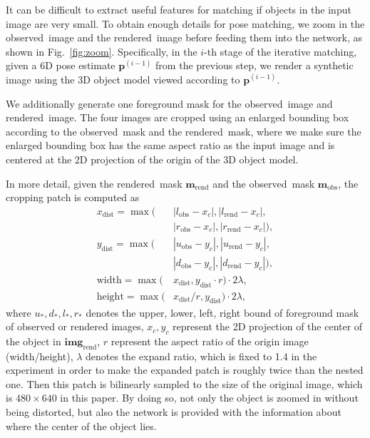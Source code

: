 \documentclass[twocolumn]{svjour3}
\newcommand{\xrend}[0]{\mathbf{img}_{\text{rend}}}
\newcommand{\mreal}[0]{\mathbf{m}_{\text{obs}}}
\newcommand{\mrend}[0]{\mathbf{m}_{\text{rend}}}
\newcommand{\rend}[0]{rendered}
\newcommand{\real}[0]{observed}
\begin{document}
It can be difficult to extract useful features for matching if objects in the input image are very small. 
To obtain enough details for pose matching, we zoom in the \real\ image and the \rend\ image before feeding them into the network, as shown in Fig.~\ref{fig:zoom}. 
Specifically, in the $i$-th stage of the iterative matching, given a 6D pose estimate $\mathbf{p}^{(i-1)}$ from the previous step, we render a synthetic image using the 3D object model viewed according to $\mathbf{p}^{(i-1)}$. 

We additionally generate one foreground mask for the \real\ image and \rend\ image. The four images are cropped using an enlarged bounding box according to the \real\ mask and the \rend\ mask, where we make sure the enlarged bounding box has the same aspect ratio as the input image and is centered at the 2D projection of the origin of the 3D object model. 

In more detail, given the \rend\ mask $\mrend$ and the \real\ mask $\mreal$, the cropping patch is computed as
\begin{equation}
\begin{split}
x_{\text{dist}} = \max(&|l_{\text{obs}}-x_{c}|, |l_{\text{rend}}-x_{c}|,\\
			  &|r_{\text{obs}}-x_{c}|, |r_{\text{rend}}-x_{c}|), \\
y_{\text{dist}} = \max(&|u_{\text{obs}}-y_{c}|, |u_{\text{rend}}-y_{c}|,\\
			  &|d_{\text{obs}}-y_{c}|, |d_{\text{rend}}-y_{c}|), \\
\text{width} = \max(&x_{\text{dist}}, y_{\text{dist}} \cdot r) \cdot 2\lambda, \\
\text{height} = \max(&x_{\text{dist}} / r, y_{\text{dist}}) \cdot 2\lambda,
\end{split}
\label{eq.zoom_bound}
\end{equation}
where $u_{*}, d_{*}, l_{*}, r_{*}$ denotes the upper, lower, left, right bound of foreground mask of observed or rendered images, $x_{c}, y_{c}$ represent the 2D projection of the center of the object in $\xrend$, $r$ represent the aspect ratio of the origin image (width/height), $\lambda$ denotes the expand ratio, which is fixed to 1.4 in the experiment in order to make the expanded patch is roughly twice than the nested one. Then this patch is bilinearly sampled to the size of the original image, which is $480 \times 640$ in this paper. By doing so, not only the object is zoomed in without being distorted, but also the network is provided with the information about where the center of the object lies.
\end{document}
